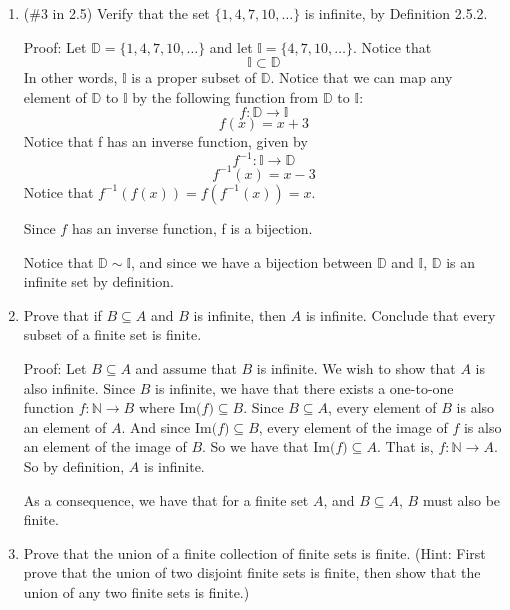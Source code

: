 \documentclass{article}
\begin{document}
\begin{enumerate}
\item{}
(\#3 in 2.5) Verify that the set $\{1,4,7,10,\ldots\}$ is infinite, by Definition 2.5.2.
\newline

Proof: Let $\mathbb{D} = \{1, 4, 7, 10, \ldots\}$ and let $\mathbb{I} = \{4, 7, 10, \ldots\}$. Notice that
\[\mathbb{I} \subset \mathbb{D}\]
In other words, $\mathbb{I}$ is a proper subset of $\mathbb{D}$. Notice that we can map any element of $\mathbb{D}$ to $\mathbb{I}$ by the following function from $\mathbb{D}$ to $\mathbb{I}$:
\[f: \mathbb{D} \to \mathbb{I}\]
\[f(x) = x + 3\]
Notice that f has an inverse function, given by
\[f^{-1}: \mathbb{I} \to \mathbb{D}\]
\[f^{-1}(x) = x - 3\]
Notice that $f^{-1}(f(x)) = f(f^{-1}(x)) = x$.

Since $f$ has an inverse function, f is a bijection.

Notice that $\mathbb{D} \sim \mathbb{I}$, and since we have a bijection between $\mathbb{D}$ and $\mathbb{I}$, $\mathbb{D}$ is an infinite set by definition.


\item{}
Prove that if $B\subseteq A$ and $B$ is infinite, then $A$ is infinite. Conclude that every subset of a finite set is finite.
\newline

Proof: Let $B \subseteq A$ and assume that $B$ is infinite. We wish to show that $A$ is also infinite. Since $B$ is infinite, we have that there exists a one-to-one function $f: \mathbb{N} \to B$ where $\text{Im($f$)} \subseteq B$. Since $B \subseteq A$, every element of $B$ is also an element of $A$. And since $\text{Im($f$)} \subseteq B$, every element of the image of $f$ is also an element of the image of $B$. So we have that $\text{Im($f$)} \subseteq A$. That is, $f: \mathbb{N} \to A$. So by definition, $A$ is infinite.
\newline


As a consequence, we have that for a finite set $A$, and $B \subseteq A$, $B$ must also be finite.



\item{}
Prove that the union of a finite collection of finite sets is finite. (Hint: First prove that the union of two disjoint finite sets is finite, then show that the union of any two finite sets is finite.)
\newline


\end{enumerate}
\end{document}
